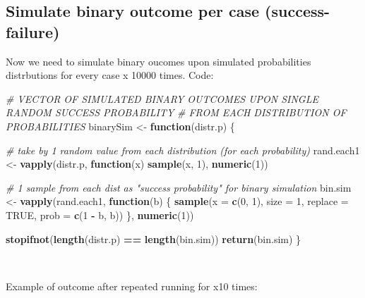\documentclass[]{article}
\newenvironment{Shaded}{\begin{snugshade}}{\end{snugshade}}
\newcommand{\CommentTok}[1]{\textcolor[rgb]{0.56,0.35,0.01}{\textit{#1}}}
\newcommand{\ControlFlowTok}[1]{\textcolor[rgb]{0.13,0.29,0.53}{\textbf{#1}}}
\newcommand{\DataTypeTok}[1]{\textcolor[rgb]{0.13,0.29,0.53}{#1}}
\newcommand{\DecValTok}[1]{\textcolor[rgb]{0.00,0.00,0.81}{#1}}
\newcommand{\KeywordTok}[1]{\textcolor[rgb]{0.13,0.29,0.53}{\textbf{#1}}}
\newcommand{\NormalTok}[1]{#1}
\newcommand{\OperatorTok}[1]{\textcolor[rgb]{0.81,0.36,0.00}{\textbf{#1}}}
\newcommand{\OtherTok}[1]{\textcolor[rgb]{0.56,0.35,0.01}{#1}}
\newcommand{\StringTok}[1]{\textcolor[rgb]{0.31,0.60,0.02}{#1}}
\begin{document}
\hypertarget{simulate-binary-outcome-per-case-success-failure}{%
\subsection{Simulate binary outcome per case
(success-failure)}\label{simulate-binary-outcome-per-case-success-failure}}

Now we need to simulate binary oucomes upon simulated probabilities
distrbutions for every case x 10000 times. Code:

\begin{Shaded}
\begin{Highlighting}[]
\CommentTok{# VECTOR OF SIMULATED BINARY OUTCOMES UPON SINGLE RANDOM SUCCESS PROBABILITY}
\CommentTok{# FROM EACH DISTRIBUTION OF PROBABILITIES }
\NormalTok{binarySim <-}\StringTok{ }\ControlFlowTok{function}\NormalTok{(distr.p) \{}
        
        \CommentTok{# take by 1 random value from each distribution (for each probability)}
\NormalTok{        rand.each1 <-}\StringTok{ }\KeywordTok{vapply}\NormalTok{(distr.p, }\ControlFlowTok{function}\NormalTok{(x) }\KeywordTok{sample}\NormalTok{(x, }\DecValTok{1}\NormalTok{), }\KeywordTok{numeric}\NormalTok{(}\DecValTok{1}\NormalTok{))}
        
        \CommentTok{# 1 sample from each dist as "success probability" for binary simulation}
\NormalTok{        bin.sim <-}\StringTok{ }\KeywordTok{vapply}\NormalTok{(rand.each1, }\ControlFlowTok{function}\NormalTok{(b) \{}
                \KeywordTok{sample}\NormalTok{(}\DataTypeTok{x       =} \KeywordTok{c}\NormalTok{(}\DecValTok{0}\NormalTok{, }\DecValTok{1}\NormalTok{),}
                       \DataTypeTok{size    =} \DecValTok{1}\NormalTok{,}
                       \DataTypeTok{replace =} \OtherTok{TRUE}\NormalTok{,}
                       \DataTypeTok{prob    =} \KeywordTok{c}\NormalTok{(}\DecValTok{1} \OperatorTok{-}\StringTok{ }\NormalTok{b, b))}
\NormalTok{                \}, }
                \KeywordTok{numeric}\NormalTok{(}\DecValTok{1}\NormalTok{))}
        
        \KeywordTok{stopifnot}\NormalTok{(}\KeywordTok{length}\NormalTok{(distr.p) }\OperatorTok{==}\StringTok{ }\KeywordTok{length}\NormalTok{(bin.sim))}
        \KeywordTok{return}\NormalTok{(bin.sim)}
\NormalTok{\}}
\end{Highlighting}
\end{Shaded}

~

Example of outcome after repeated running for x10 times:
\end{document}
